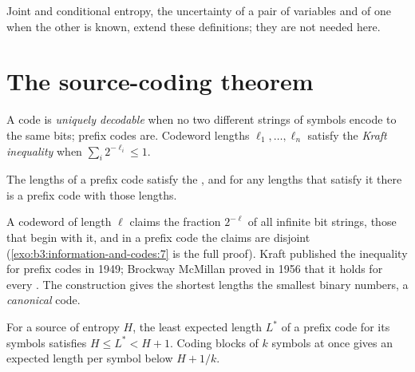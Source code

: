 Joint and conditional entropy, the uncertainty of a pair of variables and of one when the other is known, extend these definitions; they are not needed here.

\section{The source-coding theorem}\label{sec:b3:information-and-codes:source-coding}

\begin{definition}\label{def:b3:information-and-codes:prefix}
A code is \emph{uniquely decodable} when no two different strings of symbols encode to the same bits; prefix codes are. Codeword lengths $\ell_1, \ldots, \ell_n$ satisfy the \emph{Kraft inequality} when $\sum_i 2^{-\ell_i} \le 1$.
\end{definition}

\begin{theorem}[Kraft]\label{thm:b3:information-and-codes:kraft}
The lengths of a prefix code satisfy the , and for any lengths that satisfy it there is a prefix code with those lengths.
\end{theorem}

A codeword of length $\ell$ claims the fraction $2^{-\ell}$ of all infinite bit strings, those that begin with it, and in a prefix code the claims are disjoint (\cref{exo:b3:information-and-codes:7} is the full proof). Kraft published the inequality for prefix codes in 1949; Brockway McMillan proved in 1956 that it holds for every . %
The construction gives the shortest lengths the smallest binary numbers, a \emph{canonical} code.

\label{lst:b3:information-and-codes:kraft}

\label{out:b3:information-and-codes:kraft}

\begin{theorem}\label{thm:b3:information-and-codes:source-coding}
For a source of entropy $H$, the least expected length $L^*$ of a prefix code for its symbols satisfies $H \le L^* < H + 1$. Coding blocks of $k$ symbols at once gives an expected length per symbol below $H + 1/k$.
\end{theorem}

